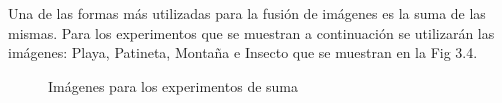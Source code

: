 Una de las formas m\'as utilizadas para la fusi\'on de im\'agenes es la suma de las mismas. Para los experimentos que se muestran a continuaci\'on se utilizar\'an las im\'agenes: Playa, Patineta, Monta\~na e Insecto que se muestran en la Fig 3.4.

\begin{figure}
	\begin{center}
		\caption{Im\'agenes para los experimentos de suma}
	\end{center}
\end{figure}

